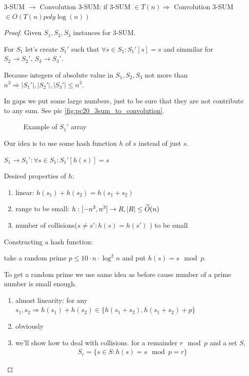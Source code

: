 \begin{thm}
  3-SUM $\to$ Convolution 3-SUM: if 3-SUM $\in T(n) \Longrightarrow$ Convolution 3-SUM $\in O(T(n) poly \log(n))$
\end{thm}
\begin{proof}
  Given $S_1, S_2, S_3$ instances for 3-SUM.

  For $S_1$ let's create $S_1'$ such that $\forall s \in S_1 : S_1'[s] = s$
  and simmilar for $S_2 \to S_2', \, S_3 \to S_3'$.

  Because integers of absolute value in $S_1, S_2, S_3$ not more than $n^3 \Longrightarrow |S_1'|, |S_2'|, |S_3'| \leq n^3$.

  In gaps we put some large numbers, just to be sure that they are not contribute to any sum. See pic \eqref{fig:pc20_3sum_to_convolution}.

\begin{figure}[ht]
    \centering
    \caption{Example of $S_1'$ array }
    \label{fig:pc20_3sum_to_convolution}
\end{figure}

  Our idea is to use some hash function $h$ of $s$ instead of just $s$.

  $S_1 \to S_1' : \forall s \in S_1 : S_1'[h(s)] = s$

  Desired properties of $h$:
  \begin{enumerate}
	\item linear: $h(s_1) + h(s_2) = h(s_1 + s_2)$
	\item range to be small: $h: [-n^3, n^3] \to R, |R| \leq \widetilde{O}(n)$
	\item number of collisions($s \neq s' : h(s) = h(s')$ ) to be small
  \end{enumerate}

  Constructing a hash function:

  take a random prime $p \leq 10 \cdot n \cdot \log^2 n$ and put $h(s) = s \mod p$.

  To get a random prime we use same idea as before cause number of a prime number is small enough.

  \begin{enumerate}
	\item almost linearity: for any $s_1, s_2 \Rightarrow h(s_1) + h(s_2) \in \{ h(s_1 + s_2), h(s_1 + s_2) + p \}$
	\item obviously
	\item we'll show how to deal with collisions.
	  for a remainder $r \mod p$ and a set $S$,
	  \begin{align*}
		S_r = \{s \in S: h(s) = s \mod p = r \}
	  \end{align*}



\end{enumerate}
\end{proof}
